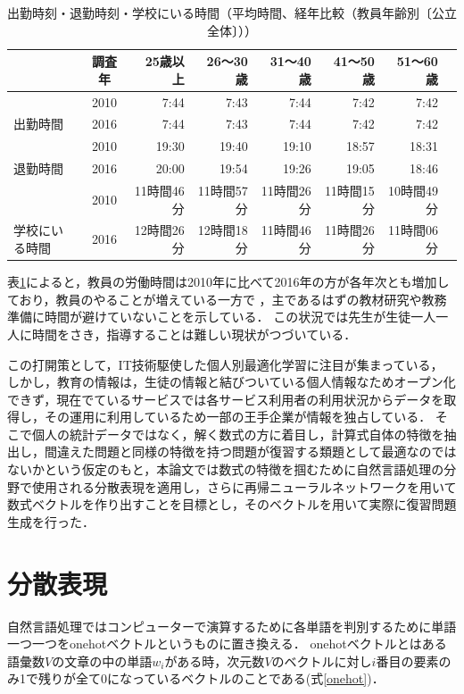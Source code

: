 \documentclass[a4j,11pt,report]{jsbook}
\begin{document}
\begin{center}
  \begin{table}
    \caption{出勤時刻・退勤時刻・学校にいる時間（平均時間、経年比較（教員年齢別〔公立全体〕））}
    \begin{tabular}{|l|c|r|r|r|r|r|r|} \hline
      & 調査年 & 25歳以上 & 26〜30歳 & 31〜40歳 & 41〜50歳 & 51〜60歳  \\ \hline \hline
      & 2010 & 7:44 & 7:43 & 7:44 & 7:42 & 7:42 \\ \cline{2-7}
      出勤時間 & 2016 & 7:44 & 7:43 & 7:44 & 7:42 & 7:42 \\ \cline{2-7}\hline
      & 2010 & 19:30 & 19:40 & 19:10 & 18:57 & 18:31 \\ \cline{2-7}
      退勤時間 & 2016 & 20:00 & 19:54 & 19:26 & 19:05 & 18:46 \\ \cline{2-7}\hline
      & 2010 & 11時間46分 & 11時間57分 & 11時間26分 & 11時間15分 & 10時間49分  \\ \cline{2-7}
      学校にいる時間  & 2016 & 12時間26分 & 12時間18分 & 11時間46分 & 11時間26分 & 11時間06分 \\ \cline{2-7}\hline
    \end{tabular}
    \label{tb:teacher_time}
  \end{table}
\end{center}

表\ref{tb:teacher_time}によると，教員の労働時間は2010年に比べて2016年の方が各年次とも増加しており，教員のやることが増えている一方で
，主であるはずの教材研究や教務準備に時間が避けていないことを示している．
この状況では先生が生徒一人一人に時間をさき，指導することは難しい現状がつづいている．

この打開策として，IT技術駆使した個人別最適化学習に注目が集まっている，
しかし，教育の情報は，生徒の情報と結びついている個人情報なためオープン化できず，現在でているサービスでは各サービス利用者の利用状況からデータを取得し，その運用に利用しているため一部の王手企業が情報を独占している．
そこで個人の統計データではなく，解く数式の方に着目し，計算式自体の特徴を抽出し，間違えた問題と同様の特徴を持つ問題が復習する類題として最適なのではないかという仮定のもと，本論文では数式の特徴を掴むために自然言語処理の分野で使用される分散表現を適用し，さらに再帰ニューラルネットワークを用いて数式ベクトルを作り出すことを目標とし，そのベクトルを用いて実際に復習問題生成を行った．

\chapter{分散表現\label{ch:Distributed representation}}
自然言語処理ではコンピューターで演算するために各単語を判別するために単語一つ一つをonehotベクトルというものに置き換える．
onehotベクトルとはある語彙数$V$の文章の中の単語$w_{i}$がある時，次元数$V$のベクトルに対し$i$番目の要素のみ1で残りが全て0になっているベクトルのことである(式\ref{onehot})．
\end{document}
